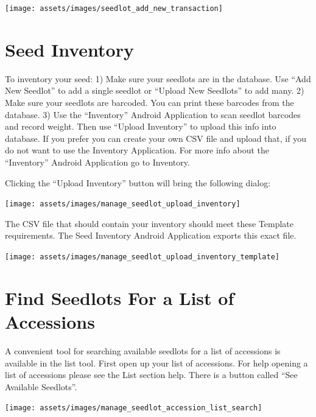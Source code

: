 \documentclass[
  12pt,
]{book}
\begin{document}
\begin{center}\texttt{[image: assets/images/seedlot\_add\_new\_transaction]} \end{center}

\hypertarget{seed-inventory}{%
\section{Seed Inventory}\label{seed-inventory}}

To inventory your seed: 1) Make sure your seedlots are in the database. Use ``Add New Seedlot'' to add a single seedlot or ``Upload New Seedlots'' to add many. 2) Make sure your seedlots are barcoded. You can print these barcodes from the database. 3) Use the ``Inventory'' Android Application to scan seedlot barcodes and record weight. Then use ``Upload Inventory'' to upload this info into database. If you prefer you can create your own CSV file and upload that, if you do not want to use the Inventory Application. For more info about the ``Inventory'' Android Application go to Inventory.

Clicking the ``Upload Inventory'' button will bring the following dialog:

\begin{center}\texttt{[image: assets/images/manage\_seedlot\_upload\_inventory]} \end{center}

The CSV file that should contain your inventory should meet these Template requirements. The Seed Inventory Android Application exports this exact file.

\begin{center}\texttt{[image: assets/images/manage\_seedlot\_upload\_inventory\_template]} \end{center}

\hypertarget{find-seedlots-for-a-list-of-accessions}{%
\section{Find Seedlots For a List of Accessions}\label{find-seedlots-for-a-list-of-accessions}}

A convenient tool for searching available seedlots for a list of accessions is available in the list tool. First open up your list of accessions. For help opening a list of accessions please see the List section help. There is a button called ``See Available Seedlots''.

\begin{center}\texttt{[image: assets/images/manage\_seedlot\_accession\_list\_search]} \end{center}
\end{document}
